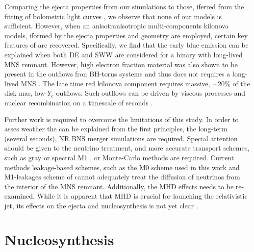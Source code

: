 Comparing the ejecta properties from our simulations to those, iferred from the 
fitting of \AT{} bolometric light curves \citep{Villar:2017wcc}, 
we observe that none of our models is sufficient. 
However, when an anisotranisotropic multi-components kilonova models, iformed by the 
ejecta properties and geometry are employed, certain key features of \AT{} are recovered.
Specifically, we find that the early blue emission can be explained 
when both \ac{DE} and \ac{SWW} are considered for a binary with long-lived \ac{MNS} remnant.
However, high electron fraction material was also shown to be present in the outflows 
fron \ac{BH}-torus systems and thus does not requires a long-lived \ac{MNS} 
\citep{Fujibayashi:2020qda}.
The late time red kilonova component requires massive, ${\sim}20\%$ of the disk mas, 
low-$Y_e$ outflows. Such outflows can be driven by viscous processes and nuclear recombination 
on a timescale of seconds \citep[\eg][]{Metzger:2008av}.

Further work is required to overcome the limitations of this study.
In order to asses weather the \AT{}  can be explained from the 
first principles, the long-term (several seconds), \ac{NR} \ac{BNS} merger simulations
are required. Special attention should be given to the neutrino treatment, and more 
accurate transport schemes, such as gray or spectral M1 \citep{Foucart:2016rxm,Roberts:2016lzn},
or Monte-Carlo methods are required. Current methods leakage-based schemes, such as 
the M0 scheme used in this work and M1-leakages scheme of \citet{Sekiguchi:2015dma,Fujibayashi:2017puw}
cannot adequately treat the diffusion of neutrinos from the interior of the \ac{MNS} remnant.
Additionally, the \ac{MHD} effects needs to be re-examined. While it is 
apparent that \ac{MHD} is crucial for launching the relativistic jet, its effects on the 
ejecta and nucleosynthesis is not yet clear \citep{Siegel:2017jug, Fernandez:2018kax}.







\section{Nucleosynthesis}

